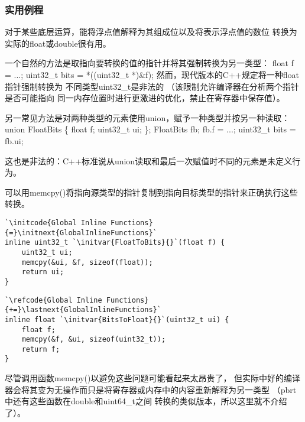 \subsubsection*{实用例程}
对于某些底层运算，能将浮点值解释为其组成位以及将表示浮点值的数位
转换为实际的{\ttfamily float}或{\ttfamily double}很有用。

一个自然的方法是取指向要转换的值的指针并将其强制转换为另一类型：
{\ttfamily\newline\noindent
float f = ...;\newline\noindent
uint32\_t bits = *((uint32\_t *)\&f);\newline
}
然而，现代版本的C++规定将一种{\ttfamily float}指针强制转换为
不同类型{\ttfamily uint32\_t}是非法的
（该限制允许编译器在分析两个指针是否可能指向
同一内存位置时进行更激进的优化，禁止在寄存器中保存值）。

另一常见方法是对两种类型的元素使用{\ttfamily union}，赋予一种类型并按另一种读取：
{\ttfamily\newline\noindent
union FloatBits \{\newline\noindent
\indent float f;\newline\noindent
\indent uint32\_t ui;\newline\noindent
\};\newline\noindent
FloatBits fb;\newline\noindent
fb.f = ...;\newline\noindent
uint32\_t bits = fb.ui;
}

这也是非法的：C++标准说从{\ttfamily union}读取和最后一次赋值时不同的元素是未定义行为。

可以用{\ttfamily memcpy()}将指向源类型的指针复制到指向目标类型的指针来正确执行这些转换。
\begin{lstlisting}
`\initcode{Global Inline Functions}{=}\initnext{GlobalInlineFunctions}`
inline uint32_t `\initvar{FloatToBits}{}`(float f) {
    uint32_t ui;
    memcpy(&ui, &f, sizeof(float));
    return ui;
}
\end{lstlisting}
\begin{lstlisting}
`\refcode{Global Inline Functions}{+=}\lastnext{GlobalInlineFunctions}`
inline float `\initvar{BitsToFloat}{}`(uint32_t ui) {
    float f;
    memcpy(&f, &ui, sizeof(uint32_t));
    return f;
}
\end{lstlisting}

尽管调用函数{\ttfamily memcpy()}以避免这些问题可能看起来太昂贵了，
但实际中好的编译器会将其变为无操作而只是将寄存器或内存中的内容重新解释为另一类型
（pbrt中还有这些函数在{\ttfamily double}和{\ttfamily uint64\_t}之间
转换的类似版本，所以这里就不介绍了）。

